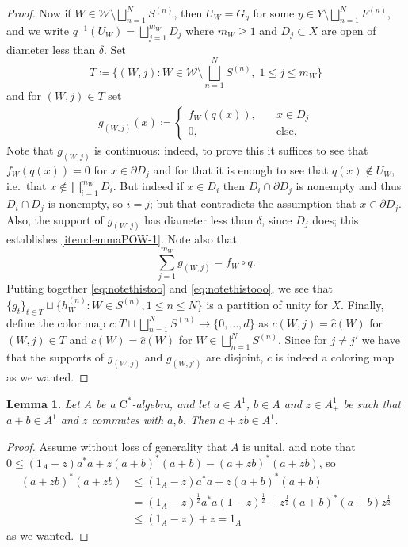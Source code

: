 \documentclass[11pt,a4paper]{amsart}
\newtheorem{lemma}[theorem]{Lemma}
\theoremstyle{definition}
\numberwithin{equation}{section}
\newcommand{\mc}[1]{\mathcal{#1}}
\begin{document}
\begin{proof}
Now if $W\in\mc{W}\setminus\bigsqcup_{n=1}^NS^{(n)}$, then $U_W=G_y$ for some $y\in Y\setminus\bigsqcup_{n=1}^NF^{(n)}$, and we write $q^{-1}(U_W)=\bigsqcup_{j=1}^{m_W}D_j$ where $m_W\ge1$ and $D_j\subset X$ are open of diameter less than $\delta$.
Set
\begin{equation}
T\coloneqq\bigg\{(W,j): W\in\mc{W}\setminus\bigsqcup_{n=1}^NS^{(n)},\; 1\le j\le m_W\bigg\}
\end{equation}
and for $(W,j)\in T$ set
\begin{align*}
g_{(W,j)}(x)\coloneqq\begin{cases} f_W(q(x)),&\quad x\in D_j\\ 0,&\quad \text{else.}\end{cases}
\end{align*}
Note that $g_{(W,j)}$ is continuous: indeed, to prove this it suffices to see that $f_W(q(x))=0$ for $x\in\partial D_j$ and for that it is enough to see that $q(x)\not\in U_W$, i.e.\ that $x\not\in \bigsqcup_{i=1}^{m_W}D_i$. But indeed if $x\in D_i$ then $D_i\cap \partial D_j$ is nonempty and thus $D_i\cap D_j$ is nonempty, so $i=j$; but that contradicts the assumption that $x\in \partial D_j$. 
Also, the support of $g_{(W,j)}$ has diameter less than $\delta$, since $D_j$ does; this establishes \ref{item:lemmaPOW-1}. Note also that
\begin{equation}\label{eq:notethistooo}
\sum_{j=1}^{m_W}g_{(W,j)}=f_W\circ q.
\end{equation}
Putting together \eqref{eq:notethistoo} and \eqref{eq:notethistooo}, we see that $\{g_t\}_{t\in T}\sqcup\{h_W^{(n)}: W\in S^{(n)}, 1\le n\le N\}$ is a partition of unity for $X$. Finally, define the color map $c\colon T\sqcup\bigsqcup_{n=1}^NS^{(n)}\to\{0,\dots,d\}$ as $c(W,j)=\hat{c}(W)$ for $(W,j)\in T$ and $c(W)=\hat{c}(W)$ for $W\in\bigsqcup_{n=1}^NS^{(n)}$. Since for $j\ne j'$ we have that the supports of $g_{(W,j)}$ and $g_{(W,j')}$ are disjoint, $c$ is indeed a coloring map as we wanted.
\end{proof}


\begin{lemma}\label{lem:central-contraction}
Let A be a $\mathrm{C}^\ast$-algebra, and let $a\in A^1$, $b\in A$ and $z\in A_+^1$ be such that $a+b\in A^1$ and $z$ commutes with $a,b$. Then $a+zb\in A^1$.
\end{lemma}

\begin{proof}
Assume without loss of generality that $A$ is unital, and note that $0\le (1_A-z)a^*a+z(a+b)^*(a+b) - (a+zb)^*(a+zb)$, so
\begin{align*}
(a+zb)^*(a+zb)&\le (1_A-z)a^*a + z(a+b)^*(a+b)\\
&=(1_A-z)^\frac{1}{2}a^*a(1-z)^\frac{1}{2}+z^\frac{1}{2}(a+b)^*(a+b)z^\frac{1}{2}\\
&\le (1_A-z)+z=1_A
\end{align*}
as we wanted.
\end{proof}
\end{document}
